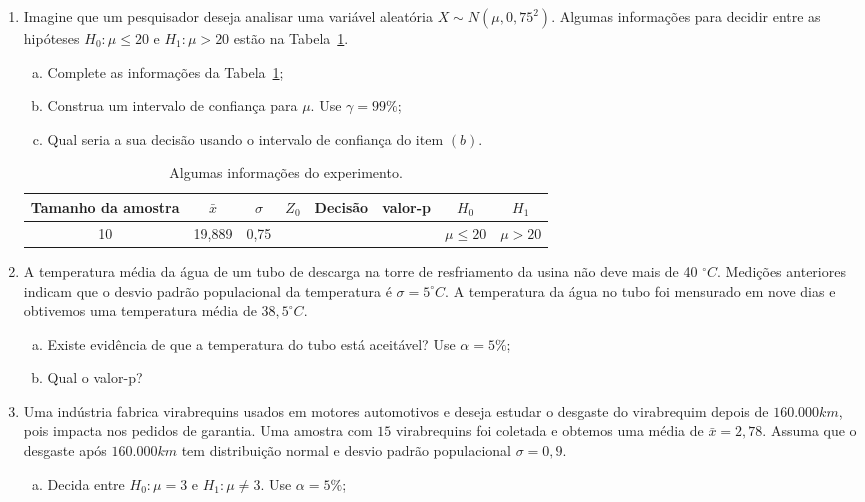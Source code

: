 \documentclass[12pt, a4paper]{article}
\begin{document}
\begin{enumerate}
	\item Imagine que um pesquisador deseja analisar uma variável aleatória $X \sim N(\mu, 0,75^2)$. Algumas informações para decidir entre as hipóteses $H_0: \mu \leq 20$ e $H_1: \mu > 20$ estão na Tabela~\ref{tab:exe3}.
	\begin{enumerate}[(a)]
		\item Complete as informações da Tabela~\ref{tab:exe3};
		\item Construa um intervalo de confiança para $\mu$. Use $\gamma = 99\%$;
		\item Qual seria a sua decisão usando o intervalo de confiança do item $(b)$.
	\end{enumerate}
	\begin{table}[htbp]
		\centering
		\begin{tabular}{c|c|c|c|c|c|c|c}
			\toprule[0.05cm]
			Tamanho da amostra & $\bar{x}$ & $\sigma$ & $Z_0$ & Decisão & valor-p & $H_0$ & $H_1$ \\ \midrule[0.025cm]
			10 & 19,889 & 0,75 & & & & $\mu \leq 20$ & $\mu > 20$ \\
			\bottomrule[0.05cm]
		\end{tabular}
		\caption{Algumas informações do experimento.}
		\label{tab:exe3}
	\end{table}

	\item A temperatura média da água de um
	tubo de descarga na torre de resfriamento da usina não deve mais de 40 $^\circ C$. Medições anteriores indicam que o desvio padrão populacional da temperatura é $\sigma = 5 ^\circ C$. A temperatura da água no tubo foi mensurado em nove dias e obtivemos uma temperatura média de $38,5 ^\circ C$.
	\begin{enumerate}[(a)]
		\item Existe evidência de que a temperatura do tubo está aceitável? Use $\alpha=5\%$;
		\item Qual o valor-p?
	\end{enumerate}

	\item Uma indústria fabrica virabrequins usados em motores automotivos e deseja estudar o desgaste do virabrequim depois de $160.000 km$, pois impacta nos pedidos de garantia. Uma amostra com $15$ virabrequins foi coletada e obtemos uma média de $\bar{x} = 2,78$. Assuma que o desgaste após $160.000 km$ tem distribuição normal e desvio padrão populacional $\sigma = 0,9$. 
	\begin{enumerate}[(a)]
		\item Decida entre $H_0: \mu = 3$ e $H_1: \mu \neq 3$. Use $\alpha = 5\%$;
	\end{enumerate}
	

\end{enumerate}
\end{document}
